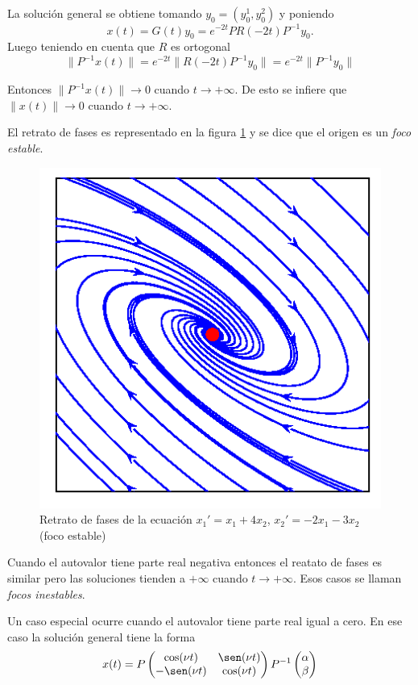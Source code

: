 \begin{ejemplo}{}
La solución general se obtiene tomando $y_0=(y_0^1,y_0^2)$ y poniendo 
\[
 x(t)=G(t)y_0=e^{-2t}P R(-2t) P^{-1}y_0.
\]
Luego teniendo en cuenta que $R$ es ortogonal
\[
 \|P^{-1}x(t)\|=e^{-2t}\| R(-2t) P^{-1}y_0\|=e^{-2t}\| P^{-1}y_0\|
\]

Entonces $ \|P^{-1}x(t)\|\to 0$ cuando $t\to+\infty$. De  esto se infiere que $ \|x(t)\|\to 0$ cuando $t\to+\infty$.
 
 El retrato de fases es  representado en la figura \ref{fig:foco_est} y se dice que el origen es un \emph{foco estable}.  
\begin{figure}[h]
\begin{center}
\includegraphics[scale=.5]{imagenes/foco_est.png}
\end{center}
\caption{Retrato de fases de la ecuación $x_1'=x_1+4x_2$,
$x_2'=-2x_1-3x_2$ (foco estable)}\label{fig:foco_est}
\end{figure}

Cuando el autovalor tiene parte real negativa entonces el reatato de fases es similar pero las soluciones tienden a $+\infty$ cuando $t\to +\infty$. Esos casos se llaman \emph{focos inestables}. 

Un caso especial ocurre cuando el autovalor tiene parte real igual a cero. En ese caso la solución general tiene la forma
\[
 x(t)=P
 \begin{pmatrix}
  \cos(\nu t) & \sen(\nu t)\\
  -\sen(\nu t)  &  \cos(\nu t)\\
 \end{pmatrix}
P^{-1}
 \begin{pmatrix}
  \alpha\\
  \beta\\
 \end{pmatrix}
\]


\end{ejemplo}
